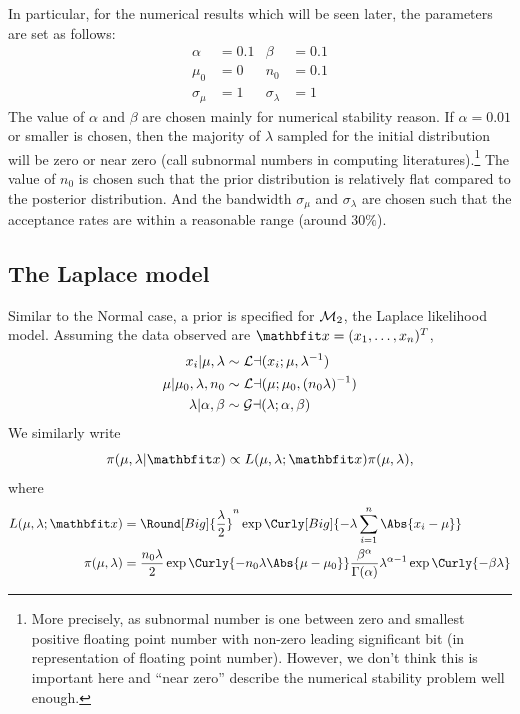 \begin{remark}
  In particular, for the numerical results which will be seen later, the
  parameters are set as follows:
  \begin{align*}
    \alpha       &= 0.1 & \beta          &= 0.1 \\
    \mu_0        &= 0 & n_0              &= 0.1 \\
    \sigma_{\mu} &= 1 & \sigma_{\lambda} &= 1
  \end{align*}
  The value of $\alpha$ and $\beta$ are chosen mainly for numerical stability
  reason. If $\alpha = 0.01$ or smaller is chosen, then the majority of
  $\lambda$ sampled for the initial distribution will be zero or near zero
  (call subnormal numbers in computing literatures).\footnote{More precisely,
    as subnormal number is one between zero and smallest positive floating
    point number with non-zero leading significant bit (in \ieee
    representation of floating point number). However, we don't think this is
    important here and ``near zero'' describe the numerical stability problem
    well enough.} The value of $n_0$ is chosen such that the prior
  distribution is relatively flat compared to the posterior distribution. And
  the \mha bandwidth $\sigma_{\mu}$ and $\sigma_{\lambda}$ are chosen such
  that the acceptance rates are within a reasonable range (around $30\%$).
\end{remark}

\subsection{The Laplace model}

Similar to the Normal case, a prior is specified for $\mathcal{M}_2$, the Laplace
likelihood model. Assuming the data observed are $\bfx = (x_1,\dots,x_n)^T$,
\begin{align}
  x_i | \mu,\lambda &\sim \mathcal{La}(x_i;\mu,\lambda^{-1}) \\
  \mu | \mu_0,\lambda,n_0 &\sim \mathcal{La}(\mu;\mu_0, (n_0\lambda)^{-1}) \\
  \lambda | \alpha,\beta &\sim \mathcal{Ga}(\lambda; \alpha, \beta)
\end{align}
We similarly write 
\begin{equation}
  \pi(\mu,\lambda|\bfx) \propto
  L(\mu,\lambda;\bfx)\pi(\mu,\lambda),
  \label{eq:laplace_posterior}
\end{equation}
where
\begin{align}
  L(\mu,\lambda;\bfx) &= \Round[Big]{\frac{\lambda}{2}}^n
  \exp\Curly[Big]{-\lambda\sum_{i=1}^n\Abs{x_i - \mu}}
  \label{eq:likelihood_laplace}\\
  \pi(\mu,\lambda) &= \frac{n_0\lambda}{2}
  \exp\Curly{-n_0\lambda\Abs{\mu - \mu_0}}
  \frac{\beta^{\alpha}}{\Gamma(\alpha)}
  \lambda^{\alpha - 1}\exp\Curly{-\beta\lambda}
  \label{eq:prior_laplace}
\end{align}

